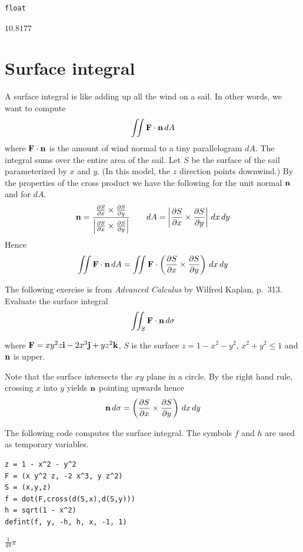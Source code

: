 \documentclass[12pt]{article}
\begin{document}
{\color{blue}
\begin{verbatim}
float
\end{verbatim}
}

$\displaystyle 10.8177$

\newpage

\section{Surface integral}

A surface integral is like adding up all the wind on a sail.
In other words, we want to compute
$$\int\!\!\!\int{\bf F\cdot n}\,dA$$
where ${\bf F\cdot n}$ is the amount of wind normal to a tiny parallelogram $dA$.
The integral sums over the entire area of the sail.
Let $S$ be the surface of the sail parameterized by $x$ and $y$.
(In this model, the $z$ direction points downwind.)
By the properties of the cross product we have the following for the unit normal $\bf n$
and for $dA$.
$${\bf n}=\frac{{\frac{\partial S}{\partial x}\times\frac{\partial S}{\partial y}}}
{{\left|\frac{\partial S}{\partial x}\times\frac{\partial S}{\partial y}\right|}}\qquad
dA=\left|\frac{\partial S}{\partial x}\times\frac{\partial S}{\partial y}\right|\,dx\,dy$$
Hence
$$\int\!\!\!\int{\bf F\cdot n}\,dA=\int\!\!\!\int{\bf F}\cdot
\left({\frac{\partial S}{\partial x}\times\frac{\partial S}{\partial y}}\right)\,dx\,dy$$

\bigskip
The following exercise is from
{\it Advanced Calculus} by Wilfred Kaplan, p.~313.
Evaluate the surface integral
$$\int\!\!\!\int_S{\bf F\cdot n}\,d\sigma$$

where ${\bf F}=xy^2z{\bf i}-2x^3{\bf j}+yz^2{\bf k}$, $S$ is the surface
$z=1-x^2-y^2$, $x^2+y^2\le1$ and $\bf n$ is upper.

\bigskip
Note that the surface intersects the $xy$ plane in a circle.
By the right hand rule, crossing $x$ into $y$ yields $\bf n$ pointing upwards hence
$${\bf n}\,d\sigma=\left({\frac{\partial S}{\partial x}\times\frac{\partial S}{\partial y}}\right)\,dx\,dy$$

The following code computes the surface integral.
The symbols $f$ and $h$ are used as temporary variables.

{\color{blue}
\begin{verbatim}
z = 1 - x^2 - y^2
F = (x y^2 z, -2 x^3, y z^2)
S = (x,y,z)
f = dot(F,cross(d(S,x),d(S,y)))
h = sqrt(1 - x^2)
defint(f, y, -h, h, x, -1, 1)
\end{verbatim}
}

$\displaystyle \tfrac{1}{48}\pi$
\end{document}
